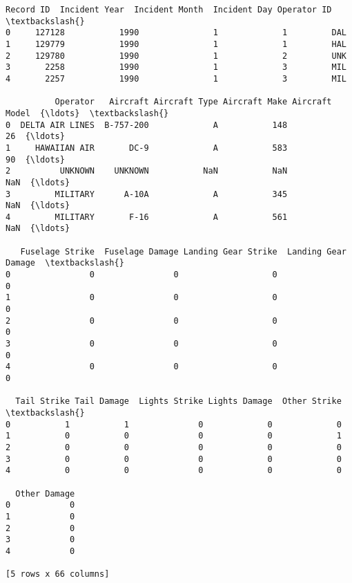 \documentclass[11pt]{article}
\makeatletter
\newcommand{\boxspacing}{\kern\kvtcb@left@rule\kern\kvtcb@boxsep}
\newcommand{\prompt}[4]{
        {\ttfamily\llap{{\color{#2}[#3]:\hspace{3pt}#4}}\vspace{-\baselineskip}}
    }
\makeatother
\begin{document}
            \begin{tcolorbox}[breakable, size=fbox, boxrule=.5pt, pad at break*=1mm, opacityfill=0]
\prompt{Out}{outcolor}{2}{\boxspacing}
\begin{Verbatim}[commandchars=\\\{\}]
   Record ID  Incident Year  Incident Month  Incident Day Operator ID  \textbackslash{}
0     127128           1990               1             1         DAL
1     129779           1990               1             1         HAL
2     129780           1990               1             2         UNK
3       2258           1990               1             3         MIL
4       2257           1990               1             3         MIL

          Operator   Aircraft Aircraft Type Aircraft Make Aircraft Model  {\ldots}  \textbackslash{}
0  DELTA AIR LINES  B-757-200             A           148             26  {\ldots}
1     HAWAIIAN AIR       DC-9             A           583             90  {\ldots}
2          UNKNOWN    UNKNOWN           NaN           NaN            NaN  {\ldots}
3         MILITARY      A-10A             A           345            NaN  {\ldots}
4         MILITARY       F-16             A           561            NaN  {\ldots}

   Fuselage Strike  Fuselage Damage Landing Gear Strike  Landing Gear Damage  \textbackslash{}
0                0                0                   0                    0
1                0                0                   0                    0
2                0                0                   0                    0
3                0                0                   0                    0
4                0                0                   0                    0

  Tail Strike Tail Damage  Lights Strike Lights Damage  Other Strike  \textbackslash{}
0           1           1              0             0             0
1           0           0              0             0             1
2           0           0              0             0             0
3           0           0              0             0             0
4           0           0              0             0             0

  Other Damage
0            0
1            0
2            0
3            0
4            0

[5 rows x 66 columns]
\end{Verbatim}
\end{tcolorbox}
        
\end{document}
